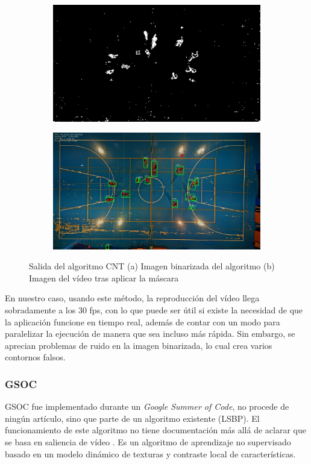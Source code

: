 \begin{figure}
\begin{subfigure}{.5\textwidth}
  \centering
  \includegraphics[width=.9\linewidth]{images/CNTsub}
  \caption { }
  \label{fig:CNT1a}
\end{subfigure}%
\begin{subfigure}{.5\textwidth}
  \centering
  \includegraphics[width=.9\linewidth]{images/CNT}
  \caption { }
  \label{fig:CNT1b}
\end{subfigure}
\caption{Salida del algoritmo CNT (a) Imagen binarizada del algoritmo (b) Imagen del vídeo tras aplicar la máscara }
\label{fig:CNT}
\end{figure}

En nuestro caso, usando este método, la reproducción del vídeo llega sobradamente a los 30 fps, con lo que puede ser útil si existe la necesidad de que la aplicación funcione en tiempo real, además de contar con un modo para paralelizar la ejecución de manera que sea incluso más rápida. Sin embargo, se aprecian problemas de ruido en la imagen binarizada, lo cual crea varios contornos falsos.

\subsubsection*{GSOC}
GSOC fue implementado durante un \textit{Google Summer of Code}, no procede de ningún artículo, sino que parte de un algoritmo existente (LSBP). El funcionamiento de este algoritmo no tiene documentación más allá de aclarar que se basa en saliencia de vídeo \cite{4967608}. Es un algoritmo de aprendizaje no supervisado basado en un modelo dinámico de texturas y contraste local de características.

